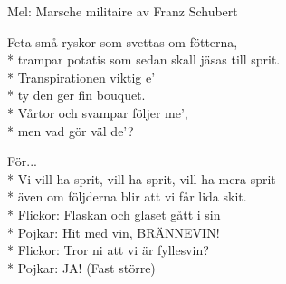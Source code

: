 \begin{SongText}
    \begin{SongInfo}
        Mel: Marsche militaire av Franz Schubert
    \end{SongInfo}
    \begin{SongVerse}
        Feta små ryskor som svettas om fötterna,\\*%
        trampar potatis som sedan skall jäsas till sprit.\\*%
        Transpirationen viktig e’\\*%
        ty den ger fin bouquet.\\*%
        Vårtor och svampar följer me’,\\*%
        men vad gör väl de’?
    \end{SongVerse}
    \begin{SongVerse}
        För...\\*%
        Vi vill ha sprit, vill ha sprit, vill ha mera sprit\\*%
        även om följderna blir att vi får lida skit.\\*%
        Flickor: Flaskan och glaset gått i sin\\*%
        Pojkar: Hit med vin, BRÄNNEVIN!\\*%
        Flickor: Tror ni att vi är fyllesvin?\\*%
        Pojkar: JA! (Fast större)
    \end{SongVerse}
\end{SongText}
